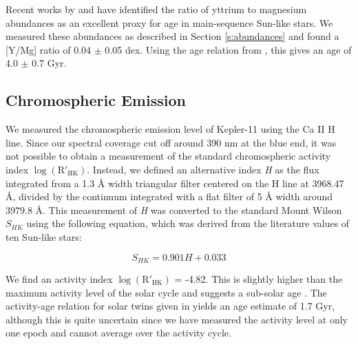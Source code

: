 \documentclass[twocolumn]{aastex61}
\begin{document}
Recent works by \citet{Nissen2015} and \citet{TucciMaia2016} have identified the ratio of yttrium to magnesium abundances as an excellent proxy for age in main-sequence Sun-like stars. We measured these abundances as described in Section \ref{s:abundances} and found a [Y/Mg] ratio of 0.04 $\pm$ 0.05 dex. Using the age relation from \citet{TucciMaia2016}, this gives an age of 4.0 $\pm$ 0.7 Gyr.

\subsection{Chromospheric Emission}

We measured the chromospheric emission level of Kepler-11 using the Ca II H line. Since our spectral coverage cut off around 390 nm at the blue end, it was not possible to obtain a measurement of the standard chromospheric activity index $\log(\mathrm{R'_{HK}})$. Instead, we defined an alternative index \textit{H} as the flux integrated from a 1.3 \r{A} width triangular filter centered on the H line at 3968.47 \r{A}, divided by the continuum integrated with a flat filter of 5 \r{A} width around 3979.8 \r{A}. This measurement of \textit{H} was converted to the standard Mount Wilson $S_{HK}$ using the following equation, which was derived from the literature values of ten Sun-like stars:

\begin{equation}
S_{HK} = 0.901 H + 0.033
\end{equation}

We find an activity index $\log(\mathrm{R'_{HK}})$ = -4.82. This is slightly higher than the maximum activity level of the solar cycle and suggests a sub-solar age \citep{Skumanich1972}. The activity-age relation for solar twins given in \citet{Freitas2016} yields an age estimate of 1.7 Gyr, although this is quite uncertain since we have measured the activity level at only one epoch and cannot average over the activity cycle.
\end{document}
